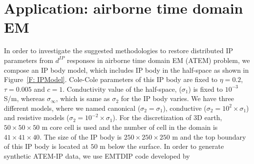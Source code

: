 \documentclass[a4paper, 11pt]{article}
\newcommand{\siginf}{\sigma_\infty}
\newcommand{\dip}{d^{IP}}
\begin{document}

\section{Application: airborne time domain EM}
In order to investigate the suggested methodologies to restore distributed IP parameters from $\dip$ responses in airborne time domain EM (ATEM) problem, we compose an IP body model, which includes IP body in the half-space as shown in Figure~\ref{F: IPModel}. Cole-Cole parameters of this IP body are fixed to $\eta=0.2$, $\tau=0.005$ and $c=1$. Conductivity value of the half-space, ($\sigma_1$) is fixed to $10^{-3}$ S/m, whereas $\siginf$, which is same as $\sigma_2$ for the IP body varies. We have three different models, where we named canonical ($\sigma_2=\sigma_1$), conductive ($\sigma_2=10^2\times\sigma_1$) and resistive models ($\sigma_2=10^{-2}\times\sigma_1$).   For the discretization of 3D earth, $50\times50\times50$ m core cell is used and the number of cell in the domain is $41\times41\times40$. The size of the IP body is $250\times250\times250$ m and the top boundary of this IP body is located at $50$ m below the surface. In order to generate synthetic ATEM-IP data, we use EMTDIP code developed by \cite{Marchant2014}
\end{document}
